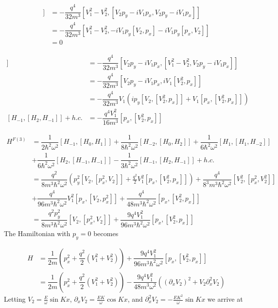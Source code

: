 \begin{align}
  [H_2,[H_{-1},H_{-1}]] &= -\dfrac{q^4}{32m^3} [V_1^2 - V_2^2, [V_2 p_y - i V_1 p_x, V_2 p_y - i V_1 p_x]] \nonumber \\
  &= -\dfrac{q^4}{32m^3} [V_1^2 - V_2^2, -i V_1p_y [V_2,p_x] - i V_1p_y [p_x,V_2]] \nonumber \\
  &= 0
\end{align}

\begin{align}
  [H_{-1}, [H_2, H_{-1}]] &= -\dfrac{q^4}{32m^3} [V_2 p_y - i V_1 p_x, [V_1^2 - V_2^2, V_2 p_y - i V_1 p_x]] \nonumber \\
  &= -\dfrac{q^4}{32m^3} [V_2 p_y - i V_1 p_x, iV_1[V_2^2,p_x]] \nonumber \\
  &= -\dfrac{q^4}{32m^3} V_1( i p_y [V_2,[V_2^2,p_x]] + V_1[p_x,[V_2^2,p_x]]) \nonumber \\
  [H_{-1}, [H_2, H_{-1}]] + h.c. &= -\dfrac{q^4V_1^2}{16m^3} [p_x,[V_2^2,p_x]]
\end{align}

\begin{align}
  H^{F(3)} &= \dfrac{1}{2\hbar^2\omega^2} [H_{-1},[H_0,H_1]] + \dfrac{1}{8\hbar^2\omega^2} [H_{-2},[H_0,H_2]] + \dfrac{1}{6\hbar^2\omega^2} [H_1,[H_1,H_{-2}]] \nonumber \\
  &+ \dfrac{1}{6\hbar^2\omega^2} [H_2,[H_{-1},H_{-1}]] - \dfrac{1}{3\hbar^2\omega^2} [H_{-1},[H_2,H_{-1}]] + h.c. \\
  &= \dfrac{q^2}{8m^3\hbar^2\omega^2} \left( p_y^2 [V_2,[p_x^2,V_2]] + \tfrac{q^2}{2} V_1^2 [p_x,[V_2^2,p_x]]\right) + \dfrac{q^4}{8^3m^3\hbar^2\omega^2} [V_2^2,[p_x^2,V_2^2]] \nonumber \\
  &+ \dfrac{q^4}{96m^3\hbar^2\omega^2} V_1^2 [p_x,[V_2,p_x^2]] + \dfrac{q^4}{48m^3\hbar^2\omega^2} [p_x,[V_2^2,p_x]] \\
  &= \dfrac{q^2 p_y^2}{8m^3\hbar^2\omega^2} [V_2,[p_x^2,V_2]] + \dfrac{9q^4V_1^2}{96m^3\hbar^2\omega^2} [p_x,[V_2^2,p_x]]
\end{align}
The Hamiltonian with $p_y=0$ becomes

\begin{align}
  H &= \dfrac{1}{2m} \left(p_x^2 + \dfrac{q^2}{2}(V_1^2+V_2^2)\right) + \dfrac{9 q^4 V_1^2}{96m^3\hbar^2\omega^2} [p_x,[V_2^2,p_x]] \nonumber \\
  &= \dfrac{1}{2m} \left(p_x^2 + \dfrac{q^2}{2}(V_1^2+V_2^2)\right) - \dfrac{9 q^4 V_1^2}{48m^3\omega^2} \left(\left(\partial_x V_2\right)^2 + V_2 \partial_x^2 V_2 \right)
\end{align}
Letting $V_2 = \tfrac{E}{\omega}\sin{Kx}$, $\partial_x V_2 = \tfrac{EK}{\omega}\cos{Kx}$, and $\partial_x^2 V_2 = -\tfrac{EK^2}{\omega} \sin{Kx}$ we arrive at

